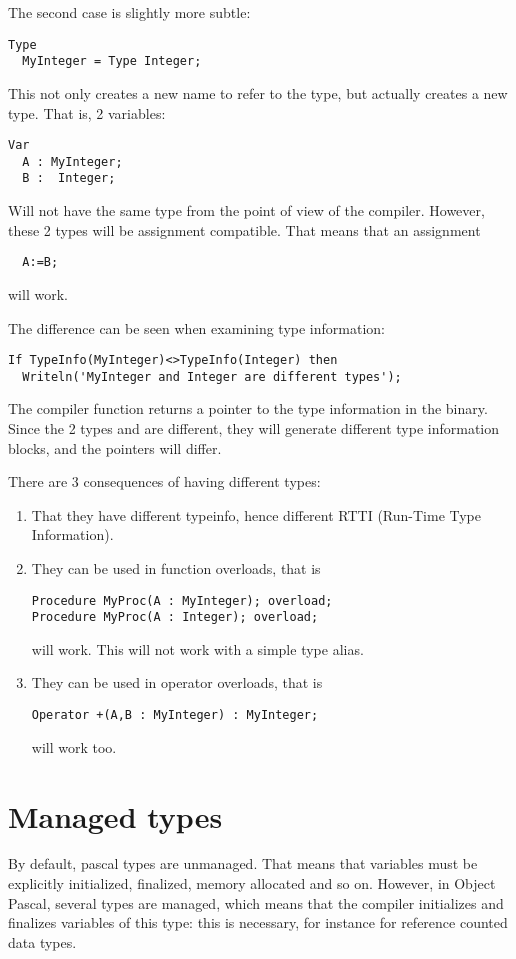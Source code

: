 The second case is slightly more subtle:
\begin{verbatim}
Type
  MyInteger = Type Integer;
\end{verbatim}
This not only creates a new name to refer to the  type, but
actually creates a new type. That is, 2 variables:
\begin{verbatim}
Var
  A : MyInteger;
  B :  Integer;
\end{verbatim}
Will not have the same type from the point of view of the compiler. However,
these 2 types will be assignment compatible.
That means that an assignment
\begin{verbatim}
  A:=B;
\end{verbatim}
will work.

The difference can be seen when examining type information:
\begin{verbatim}
If TypeInfo(MyInteger)<>TypeInfo(Integer) then
  Writeln('MyInteger and Integer are different types');
\end{verbatim}
The compiler function  returns a pointer to the type
information in the binary. Since the 2 types  and
 are different, they will generate different type 
information blocks, and the pointers will differ.

There are 3 consequences of having different types:
\begin{enumerate}
\item That they have different typeinfo, hence different RTTI (Run-Time Type Information).
\item They can be used in function overloads, that is
\begin{verbatim}
Procedure MyProc(A : MyInteger); overload;
Procedure MyProc(A : Integer); overload;
\end{verbatim}
will work. This will not work with a simple type alias.
\item They can be used in operator overloads, that is
\begin{verbatim}
Operator +(A,B : MyInteger) : MyInteger; 
\end{verbatim}
will work too.
\end{enumerate}

\section{Managed types}
\label{se:managedtypes}
By default, pascal types are unmanaged. That means that variables must be
explicitly initialized, finalized, memory allocated and so on. 
However, in Object Pascal, several types are managed, which means that the 
compiler initializes and finalizes variables of this type: this is necessary, 
for instance for reference counted data types.

